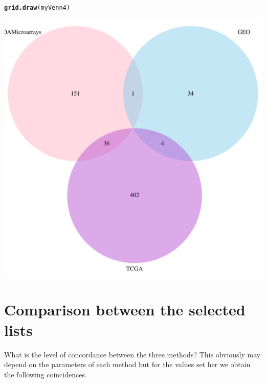 \documentclass[a4paper,10pt]{article}\usepackage[]{graphicx}\usepackage[]{color}
\makeatletter
\def\maxwidth{ %
  \ifdim\Gin@nat@width>\linewidth
    \linewidth
  \else
    \Gin@nat@width
  \fi
}
\newcommand{\hlstd}[1]{\textcolor[rgb]{0.345,0.345,0.345}{#1}}%
\newcommand{\hlkwd}[1]{\textcolor[rgb]{0.737,0.353,0.396}{\textbf{#1}}}%
\newenvironment{kframe}{%
 \def\at@end@of@kframe{}%
 \ifinner\ifhmode%
  \def\at@end@of@kframe{\end{minipage}}%
  \begin{minipage}{\columnwidth}%
 \fi\fi%
 \def\FrameCommand##1{\hskip\@totalleftmargin \hskip-\fboxsep
 \colorbox{shadecolor}{##1}\hskip-\fboxsep
     \hskip-\linewidth \hskip-\@totalleftmargin \hskip\columnwidth}%
 \MakeFramed {\advance\hsize-\width
   \@totalleftmargin\z@ \linewidth\hsize
   \@setminipage}}%
 {\par\unskip\endMakeFramed%
 \at@end@of@kframe}
\newenvironment{knitrout}{}{} %
\makeatother
\begin{document}
\begin{knitrout}
\begin{kframe}
\begin{alltt}
\hlkwd{grid.draw}\hlstd{(myVenn4)}
\end{alltt}
\end{kframe}
\includegraphics[width=\maxwidth]{figure/selectLGenes1-3} 

\end{knitrout}

\section{Comparison between the selected lists}

What is the level of concordance between the three methods? This obviously may depend on the parameters of each method but for the values set her we obtain the following coincidences.
\end{document}
